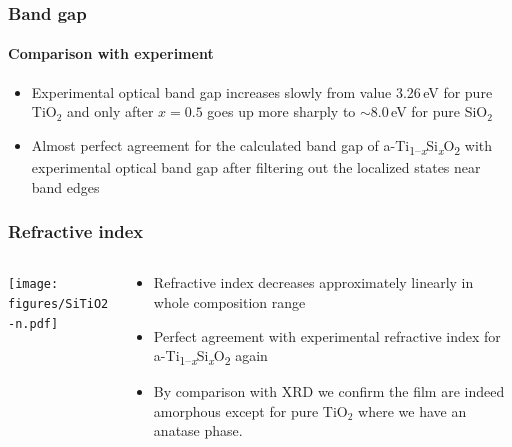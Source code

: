 \documentclass[noamsthm,8pt,t,xcolor={dvipsnames}]{beamer}
\def\TiSiO{Ti\textsubscript{1--\itshape x}Si\textsubscript{\itshape x}O\textsubscript{2}}
\begin{document}
\begin{frame}
   \frametitle{Band gap}
   \framesubtitle{Comparison with experiment}

   \begin{center}
   \end{center}

   \begin{itemize}
      \item Experimental optical band gap increases slowly from value 3.26\,eV for pure TiO$_2$ and only after $x = 0.5$ goes up more sharply to $\sim$8.0\,eV for pure SiO$_2$
      \item<2> Almost perfect agreement for the calculated band gap of a-\TiSiO{} with experimental optical band gap after filtering out the localized states near band edges
   \end{itemize}
\end{frame}

\begin{frame}
\frametitle{Refractive index}
   \begin{columns}
      \begin{column}{0.7\textwidth}
         \vspace{-0.4cm}
         \begin{center}
            \texttt{[image: figures/SiTiO2-n.pdf]}

         \end{center}
      \end{column}
      \begin{column}{0.3\textwidth}
            \begin{itemize}
               \item Refractive index decreases approximately linearly in whole composition range
               \item Perfect agreement with experimental refractive index for a-\TiSiO{} again
               \item<2> By comparison with XRD we confirm the film are indeed amorphous except for pure TiO$_2$ where we have an anatase phase.
            \end{itemize}
      \end{column}
   \end{columns}
\end{frame}
\end{document}
